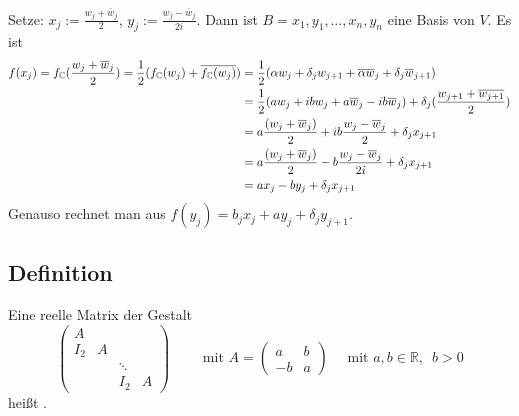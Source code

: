 Setze: $x_j := \frac{w_j + \overline{w}_j }{2} $, $y_j := \frac{w_j - \overline{w}_j }{2i} $. Dann ist $B=x_1, y_1, \ldots , x_n, y_n$ eine Basis von $V$. Es ist
\begin{align*}
	f(x_j) = f_{\mathbb{C}} (\frac{w_j + \overline{w}_j }{2} ) = \frac{1}{2} (f_{\mathbb{C}}(w_j) + \overline{f_{\mathbb{C}} (w_j)})   &=
	\frac{1}{2} ( \alpha w_j + \delta_j w_{j+1} + \overline{\alpha} \overline{w}_j + \delta_j \overline{w}_{j+1}   )\\
	 &= \frac{1}{2} (a w_j + i b w_j + a \overline{w}_j
	- i b \overline{w}_j  ) + \delta_j (\frac{w_{j+1} + \overline{w_{j+1}} }{2} )  \\
	&= a \frac{(w_j + \overline{w}_j )}{2} + i b \frac{w_j - \overline{w}_j }{2}  + \delta_j x_{j+1} \\
	&= a \frac{(w_j + \overline{w}_j )}{2} -  b \frac{w_j - \overline{w}_j }{2i}  + \delta_j x_{j+1} \\
	&= a x_j - b y_j + \delta_j x_{j+1}
\end{align*}
Genauso rechnet man aus $f(y_j) = b_j x_j + a y_j + \delta_j y_{j+1}$. \bewende

\subsection[Definition: verallgemeinerter Jordankasten]{Definition} %
\label{sub:118}
Eine reelle Matrix der Gestalt
\[
	\begin{pmatrix}
		A & & & \\
		I_2 & A & & \\
		& & \ddots & \\
		& & I_2 & A
	\end{pmatrix} \qquad \text{ mit } A= \begin{pmatrix}
		a &b \\
		-b &a
	\end{pmatrix} \quad \text{ mit } a,b \in \mathds{R}, \enspace b>0
\]
heißt . 

